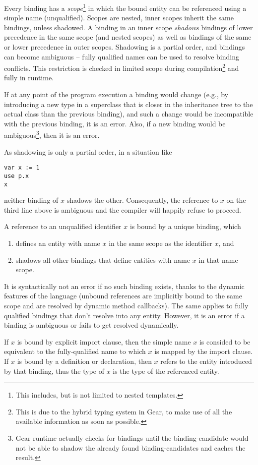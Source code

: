Every binding has a \emph{scope}\footnote{This includes, but is not limited to nested templates.} in which the bound entity can be referenced using a simple name (unqualified). Scopes are nested, inner scopes inherit the same bindings, unless shadowed. A binding in an inner scope \emph{shadows} bindings of lower precedence in the same scope (and nested scopes) as well as bindings of the same or lower precedence in outer scopes. Shadowing is a partial order, and bindings can become ambiguous -- fully qualified names can be used to resolve binding conflicts. This restriction is checked in limited scope during compilation\footnote{This is due to the hybrid typing system in Gear, to make use of all the available information as soon as possible.} and fully in runtime. 

If at any point of the program execution a binding would change (e.g., by introducing a new type in a superclass that is closer in the inheritance tree to the actual class than the previous binding), and such a change would be incompatible with the previous binding, it is an error. Also, if a new binding would be ambiguous\footnote{Gear runtime actually checks for bindings until the binding-candidate would not be able to shadow the already found binding-candidates and caches the result.}, then it is an error. 

As shadowing is only a partial order, in a situation like

\begin{lstlisting}
var x := 1
use p.x
x
\end{lstlisting}

neither binding of $x$ shadows the other. Consequently, the reference to $x$ on the third line above is ambiguous and the compiler will happily refuse to proceed. 

A reference to an unqualified identifier $x$ is bound by a unique binding, which

\begin{enumerate}
\item defines an entity with name $x$ in the same scope as the identifier $x$, and
\item shadows all other bindings that define entities with name $x$ in that name scope.
\end{enumerate}

It is syntactically not an error if no such binding exists, thanks to the dynamic features of the language (unbound references are implicitly bound to the same scope and are resolved by dynamic method callbacks). The same applies to fully qualified bindings that don't resolve into any entity. However, it is an error if a binding is ambiguous or fails to get resolved dynamically.

If $x$ is bound by explicit \lstinline@use@ import clause, then the simple name $x$ is consided to be equivalent to the fully-qualified name to which $x$ is mapped by the import clause. If $x$ is bound by a definition or declaration, then $x$ refers to the entity introduced by that binding, thus the type of $x$ is the type of the referenced entity. 







